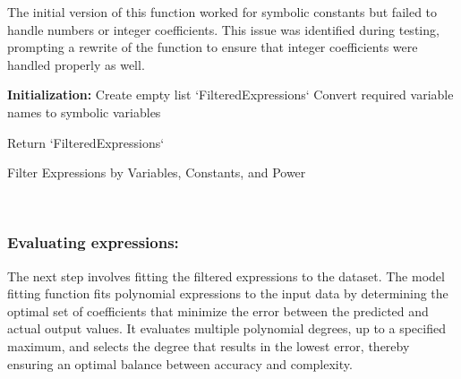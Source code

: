 \documentclass{article}
\begin{document}
The initial version of this function worked for symbolic constants but failed to handle numbers or integer coefficients. This issue was identified during testing, prompting a rewrite of the function to ensure that integer coefficients were handled properly as well.\\


\begin{algorithm}[H]
\SetAlgoLined
{}

\textbf{Initialization:}\;
Create empty list `FilteredExpressions`\;
Convert required variable names to symbolic variables\;


Return `FilteredExpressions`\;

\caption{Filter Expressions by Variables, Constants, and Power}
\label{alg:filter_expressions} 
\end{algorithm}\\





\subsubsection{Evaluating expressions:}

The next step involves fitting the filtered expressions to the dataset. The model fitting function fits polynomial expressions to the input data by determining the optimal set of coefficients that minimize the error between the predicted and actual output values. It evaluates multiple polynomial degrees, up to a specified maximum, and selects the degree that results in the lowest error, thereby ensuring an optimal balance between accuracy and complexity.\\
\end{document}
